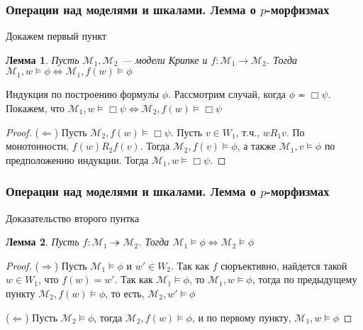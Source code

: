 \documentclass[pdf,utf8,russian,aspectratio=169]{beamer}
\newtheorem{lem}{Лемма}
\begin{document}
\begin{frame}
  \frametitle{Операции над моделями и шкалами. Лемма о $p$-морфизмах}

  Докажем первый пункт

  \begin{lem}
    Пусть $\mathcal{M}_1, \mathcal{M}_2$ --- модели Крипке и $f : \mathcal{M}_1 \to \mathcal{M}_2$. Тогда
    $\mathcal{M}_1, w \models \phi \Leftrightarrow \mathcal{M}_1, f(w) \models \phi$
  \end{lem}

  Индукция по построению формулы $\phi$. Рассмотрим случай, когда $\phi \eqcirc \Box \psi$. Покажем, что $\mathcal{M}_1, w \models \Box \psi \Leftrightarrow \mathcal{M}_2, f(w) \models \Box \psi$

  \begin{proof}
    ($\Leftarrow$) Пусть $\mathcal{M}_2, f(w) \models \Box \psi$. Пусть $v \in W_1$, т.ч., $w R_1 v$. По монотонности,
    $f(w) R_2 f(v)$. Тогда $\mathcal{M}_2, f(v) \models \phi$, а также $\mathcal{M}_1, v \models \phi$ по предположению индукции. Тогда $\mathcal{M}_1, w \models \Box \psi$.
  \end{proof}
\end{frame}

\begin{frame}
  \frametitle{Операции над моделями и шкалами. Лемма о $p$-морфизмах}

  Доказательство второго пунтка

  \begin{lem}
    Пусть $f : \mathcal{M}_1 \twoheadrightarrow \mathcal{M}_2$. Тогда $\mathcal{M}_1 \models \phi \Leftrightarrow \mathcal{M}_2 \models \phi$
  \end{lem}

  \begin{proof}
    ($\Rightarrow$) Пусть $\mathcal{M}_1 \models \phi$ и $w' \in W_2$. Так как $f$ сюръективно, найдется такой $w \in W_1$,
    что $f(w) = w'$. Так как $\mathcal{M}_1 \models \phi$, то $\mathcal{M}_1, w \models \phi$, тогда по предыдущему пункту
    $\mathcal{M}_2, f(w) \models \phi$, то есть, $\mathcal{M}_2, w' \models \phi$


    ($\Leftarrow$) Пусть $\mathcal{M}_2 \models \phi$, тогда $\mathcal{M}_2, f(w) \models \phi$, и по первому пункту, $\mathcal{M}_1, w \models \phi$
  \end{proof}
\end{frame}
\end{document}
